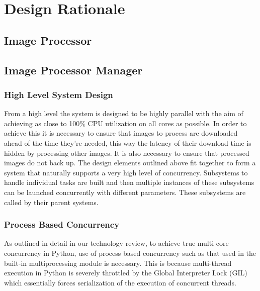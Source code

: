 \documentclass[10pt, onecolumn, draftclsnofoot, letterpaper, compsoc]{IEEEtran}
\begin{document}
\section{Design Rationale}

\subsection{Image Processor}

\subsection{Image Processor Manager}

    \subsubsection{High Level System Design}
    From a high level the system is designed to be highly parallel with the aim of achieving as close to 
    100\% CPU utilization on all cores as possible. In order to achieve this it is necessary to ensure that 
    images to process are downloaded ahead of the time they're needed, this way the latency of their download 
    time is hidden by processing other images. It is also necessary to ensure that processed images do not back 
    up. The design elements outlined above fit together to form a system that naturally supports a very high 
    level of concurrency. Subsystems to handle individual tasks are built and then multiple instances of these 
    subsystems can be launched concurrently with different parameters. These subsystems are called by their 
    parent systems. \\

    \subsubsection{Process Based Concurrency}
    As outlined in detail in our technology review, to achieve true multi-core concurrency in Python, use of 
    process based concurrency such as that used in the built-in multiprocessing module is necessary. This is 
    because multi-thread execution in Python is severely throttled by the Global Interpreter Lock (GIL) which 
    essentially forces serialization of the execution of concurrent threads. \\
\end{document}
